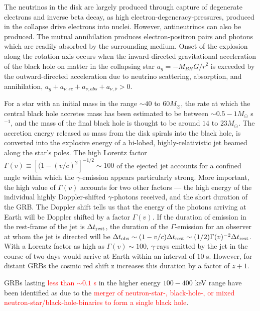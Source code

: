 \documentclass[12pt,a4paper]{article}
\begin{document}
The neutrinos in the disk are largely produced through capture of degenerate electrons and inverse beta decay, as high electron-degeneracy-pressures, produced in the collapse drive electrons into nuclei. However, antineutrinos can also be produced. The mutual annihilation produces electron-positron pairs and photons which are readily absorbed by the surrounding medium. Onset of the explosion along the rotation axis occurs when the inward-directed gravitational acceleration of the black hole on matter in the collapsing star $a_g = -M_{BH} G/r^2$ is exceeded by the outward-directed acceleration due to neutrino scattering, absorption, and annihilation, $a_g + a_{\nu,sc} + a_{\nu,abs} + a_{\nu, \bar{\nu}} > 0$.

For a star with an initial mass in the range $\sim 40$ to $60 M_\odot$, the rate at which the central black hole accretes mass has been estimated to be between $\sim 0.5-1 M_\odot$ s$^{-1}$, and the mass of the final black hole is thought to be around $14$ to $23 M_\odot$. The accretion energy released as mass from the disk spirals into the black hole, is converted into the explosive energy of a bi-lobed, highly-relativistic jet beamed along the star's poles. The high Lorentz factor $\Gamma(v) \equiv [(1 - (v/c)^2]^{-1/2} \sim 100$ of the ejected jet accounts for a confined angle within which the $\gamma$-emission appears particularly strong. More important, the high value of $\Gamma(v)$ accounts for two other factors --- the high energy of the individual highly Doppler-shifted $\gamma$-photons received, and the short duration of the GRB. The Doppler shift tells us that the energy of the photons arriving at Earth will be Doppler shifted by a factor $\Gamma(v)$. If the duration of emission in the rest-frame of the jet is $\Delta t_{\rm rest}$, the duration of the $\Gamma$-emission for an observer at whom the jet is directed will be $\Delta t_{\rm obs} \sim (1 - v/c) \Delta t_{\rm rest} \sim (1/2)\Gamma(v)^{-2} \Delta t_{\rm rest}$. With a Lorentz factor as high as $\Gamma(v) \sim 100$, $\gamma$-rays emitted by the jet in the course of two days would arrive at Earth within an interval of $10$ s. However, for distant GRBs the cosmic red shift z increases this duration by a factor of $z + 1$. 

GRBs lasting \textcolor{red}{less than $\sim 0.1$ s} in the higher energy $100-400$ keV range have been identified as due to the \textcolor{red}{merger of neutron-star-, black-hole-, or mixed neutron-star/black-hole-binaries to form a single black hole}. 
\end{document}
